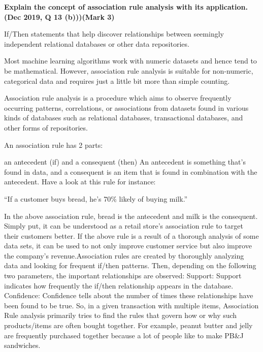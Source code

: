 
\textbf{\textcolor{LightMagenta}{Explain the concept of association rule analysis with its application. (Dec 2019, Q 13 (b)))\hfill (Mark 3)}} \\[5pt]
 {If/Then statements that help discover relationships between seemingly independent relational databases or other data repositories.

Most machine learning algorithms work with numeric datasets and hence tend to be mathematical. However, association rule analysis is suitable for non-numeric, categorical data and requires just a little bit more than simple counting.

Association rule analysis is a procedure which aims to observe frequently occurring patterns, correlations, or associations from datasets found in various kinds of databases such as relational databases, transactional databases, and other forms of repositories.

An association rule has 2 parts:

an antecedent (if) and
a consequent (then)
An antecedent is something that’s found in data, and a consequent is an item that is found in combination with the antecedent. Have a look at this rule for instance:

“If a customer buys bread, he’s 70\% likely of buying milk.”

In the above association rule, bread is the antecedent and milk is the consequent. Simply put, it can be understood as a retail store’s association rule to target their customers better. If the above rule is a result of a thorough analysis of some data sets, it can be used to not only improve customer service but also improve the company’s revenue.Association rules are created by thoroughly analyzing data and looking for frequent if/then patterns. Then, depending on the following two parameters, the important relationships are observed:
Support: Support indicates how frequently the if/then relationship appears in the database.
Confidence: Confidence tells about the number of times these relationships have been found to be true.
So, in a given transaction with multiple items, Association Rule analysis primarily tries to find the rules that govern how or why such products/items are often bought together. For example, peanut butter and jelly are frequently purchased together because a lot of people like to make PB&J sandwiches.}

